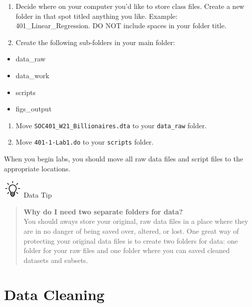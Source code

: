 \documentclass[
]{book}
\providecommand{\tightlist}{%
  \setlength{\itemsep}{0pt}\setlength{\parskip}{0pt}}
\begin{document}
\begin{enumerate}
\def\labelenumi{\arabic{enumi}.}
\tightlist
\item
  Decide where on your computer you'd like to store class files. Create a new folder in that spot titled anything you like. Example: 401\_Linear\_Regression. DO NOT include spaces in your folder title.
\item
  Create the following sub-folders in your main folder:
\end{enumerate}

\begin{itemize}
\tightlist
\item
  data\_raw
\item
  data\_work
\item
  scripts
\item
  figs\_output
\end{itemize}

\begin{enumerate}
\def\labelenumi{\arabic{enumi}.}
\setcounter{enumi}{2}
\tightlist
\item
  Move \texttt{SOC401\_W21\_Billionaires.dta} to your \texttt{data\_raw} folder.
\item
  Move \texttt{401-1-Lab1.do} to your \texttt{scripts} folder.
\end{enumerate}

When you begin labs, you should move all raw data files and script files to the appropriate locations.

\includegraphics[width=0.36458in,height=\textheight]{images/bulb.png} Data Tip

\begin{quote}
\textbf{Why do I need two separate folders for data?}\\
You should aways store your original, raw data files in a place where they are in no danger of being saved over, altered, or lost. One great way of protecting your original data files is to create two folders for data: one folder for your raw files and one folder where you can saved cleaned datasets and subsets.
\end{quote}

\hypertarget{data-cleaning}{%
\section{Data Cleaning}\label{data-cleaning}}
\end{document}
